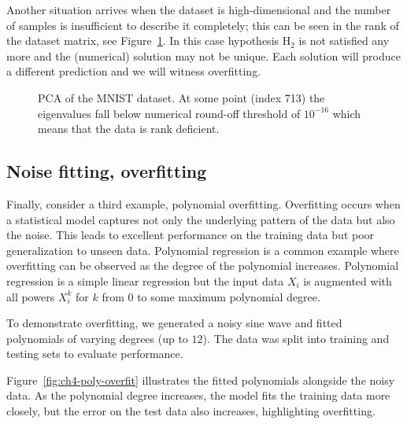 Another situation arrives when the dataset is high-dimensional and the number
of samples is insufficient to describe it completely; this can be seen in the rank
of the dataset matrix, see Figure~\ref{fig:ch4-pca-mnist}. In this case hypothesis H$_2$ is not satisfied
any more and the (numerical) solution may not be unique. Each solution will
produce a different prediction and we will witness overfitting.

\begin{figure}[h]\centering
\caption{PCA of the MNIST dataset. At some point (index 713) the eigenvalues fall below numerical round-off threshold of $10^{-16}$ which means that the data is rank deficient.}\label{fig:ch4-pca-mnist}
\end{figure}

\subsection{Noise fitting, overfitting}

Finally, consider a third example, polynomial overfitting. Overfitting occurs
when a statistical model captures not only the underlying pattern of the data
but also the noise. This leads to excellent performance on the training data
but poor generalization to unseen data. Polynomial regression is a common
example where overfitting can be observed as the degree of the polynomial
increases. Polynomial regression is a simple linear regression but the input
data $X_i$ is augmented with all powers $X_i^k$ for $k$ from $0$ to some maximum
polynomial degree.

To demonstrate overfitting, we generated a noisy sine wave and fitted polynomials of varying degrees (up to $12$). The data was split into training and
testing sets to evaluate performance.

Figure~\ref{fig:ch4-poly-overfit} illustrates the fitted polynomials alongside the noisy data. As
the polynomial degree increases, the model fits the training data more closely,
but the error on the test data also increases, highlighting overfitting.

